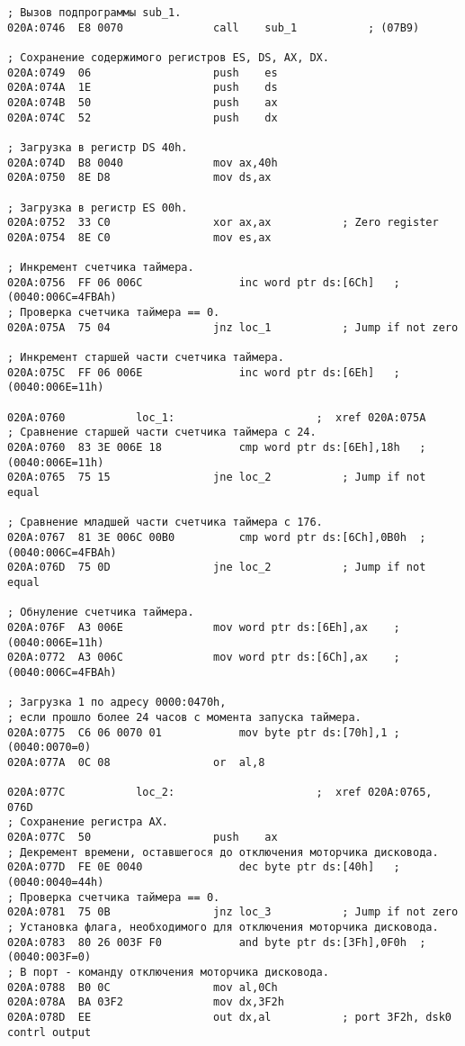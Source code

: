 \begin{lstlisting}[style={asm}]
; Вызов подпрограммы sub_1.
020A:0746  E8 0070				call	sub_1			; (07B9)

; Сохранение содержимого регистров ES, DS, AX, DX.
020A:0749  06					push	es
020A:074A  1E					push	ds
020A:074B  50					push	ax
020A:074C  52					push	dx

; Загрузка в регистр DS 40h.
020A:074D  B8 0040				mov	ax,40h
020A:0750  8E D8				mov	ds,ax

; Загрузка в регистр ES 00h.
020A:0752  33 C0				xor	ax,ax			; Zero register
020A:0754  8E C0				mov	es,ax

; Инкремент счетчика таймера.
020A:0756  FF 06 006C				inc	word ptr ds:[6Ch]	; (0040:006C=4FBAh)
; Проверка счетчика таймера == 0.
020A:075A  75 04				jnz	loc_1			; Jump if not zero

; Инкремент старшей части счетчика таймера.
020A:075C  FF 06 006E				inc	word ptr ds:[6Eh]	; (0040:006E=11h)

020A:0760			loc_1:						;  xref 020A:075A
; Сравнение cтаршей части счетчика таймера с 24.
020A:0760  83 3E 006E 18			cmp	word ptr ds:[6Eh],18h	; (0040:006E=11h)
020A:0765  75 15				jne	loc_2			; Jump if not equal

; Сравнение младшей части счетчика таймера с 176.
020A:0767  81 3E 006C 00B0			cmp	word ptr ds:[6Ch],0B0h	; (0040:006C=4FBAh)
020A:076D  75 0D				jne	loc_2			; Jump if not equal

; Обнуление счетчика таймера.
020A:076F  A3 006E				mov	word ptr ds:[6Eh],ax	; (0040:006E=11h)
020A:0772  A3 006C				mov	word ptr ds:[6Ch],ax	; (0040:006C=4FBAh)

; Загрузка 1 по адресу 0000:0470h,
; если прошло более 24 часов с момента запуска таймера.
020A:0775  C6 06 0070 01			mov	byte ptr ds:[70h],1	; (0040:0070=0)
020A:077A  0C 08				or	al,8

020A:077C			loc_2:						;  xref 020A:0765, 076D
; Сохранение регистра AX.
020A:077C  50					push	ax
; Декремент времени, оставшегося до отключения моторчика дисковода.
020A:077D  FE 0E 0040				dec	byte ptr ds:[40h]	; (0040:0040=44h)
; Проверка счетчика таймера == 0.
020A:0781  75 0B				jnz	loc_3			; Jump if not zero
; Установка флага, необходимого для отключения моторчика дисковода.
020A:0783  80 26 003F F0			and	byte ptr ds:[3Fh],0F0h	; (0040:003F=0)
; В порт - команду отключения моторчика дисковода.
020A:0788  B0 0C				mov	al,0Ch
020A:078A  BA 03F2				mov	dx,3F2h
020A:078D  EE					out	dx,al			; port 3F2h, dsk0 contrl output


\end{lstlisting}
